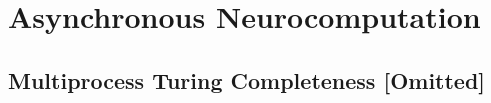 \section{Asynchronous Neurocomputation}




\subsection{Multiprocess Turing Completeness [Omitted]}
